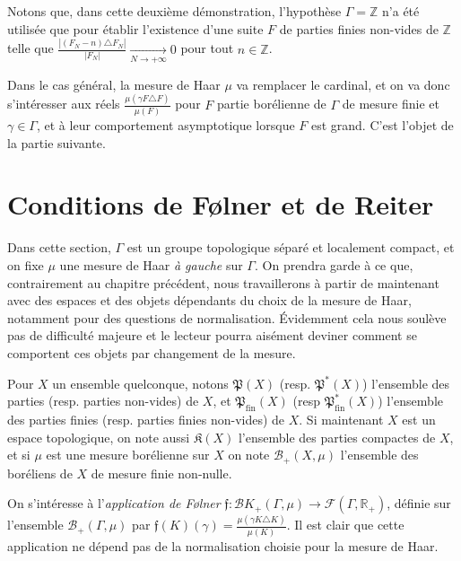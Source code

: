 \documentclass[a4paper,12pt]{article}
\newcommand{\R}{\mathbb{R}}
\newcommand{\Z}{\mathbb{Z}}
\newcommand{\Bor}{\mathcal{B}}
\newcommand{\abs}[1]{\left\vert#1\right\vert}
\newcommand{\card}[1]{\abs{#1}}
\newcommand{\parts}{\mathfrak{P}}
\newcommand{\finparts}{\mathfrak{P}_{\mathrm{fin}}}
\begin{document}
Notons que, dans cette deuxième démonstration, l'hypothèse $\Gamma=\Z$ n'a été utilisée que pour établir l'existence d'une suite $F$ 
de parties finies non-vides de $\Z$
telle que $\frac{\card{(F_N-n)\triangle F_N}}{\card{F_N}} \xrightarrow[N\to+\infty]{} 0$ pour tout $n\in\Z$. 

Dans le cas général, la mesure de Haar $\mu$ va remplacer le cardinal, et on va donc s'intéresser aux réels $\frac{\mu(\gamma F \triangle F)}{\mu(F)}$ 
pour $F$ partie borélienne de $\Gamma$ de mesure finie et $\gamma\in\Gamma$, et à leur comportement asymptotique
lorsque $F$ est grand. C'est l'objet de la partie suivante.

\section{Conditions de F\o{}lner et de Reiter}

Dans cette section, $\Gamma$ est un groupe topologique séparé et localement compact, et on fixe 
$\mu$ une mesure de Haar \emph{à gauche} sur $\Gamma$. On prendra garde à ce que, contrairement au chapitre précédent,
nous travaillerons à partir de maintenant avec des espaces et des objets dépendants du choix de la mesure de Haar,
notamment pour des questions de normalisation. Évidemment cela nous soulève pas de difficulté majeure et 
le lecteur pourra aisément deviner comment se comportent ces objets par changement de la mesure.

Pour $X$ un ensemble quelconque, notons $\parts(X)$ (resp. $\parts^*(X)$) l'ensemble des parties (resp. parties non-vides) de $X$, et $\finparts(X)$ (resp $\finparts^*(X)$) 
l'ensemble des parties finies (resp. parties finies non-vides) de $X$. Si maintenant $X$ est un espace topologique, 
on note aussi $\mathfrak{K}(X)$ l'ensemble des parties compactes de $X$, et si $\mu$ est une mesure borélienne sur 
$X$ on note $\Bor_+(X, \mu)$ l'ensemble des boréliens de $X$ de mesure finie non-nulle. 

On s'intéresse à l'\emph{application de F\o{}lner} $\mathfrak{f} : \Bor{K}_+(\Gamma, \mu) \to \mathcal{F}(\Gamma, \R_+)$, définie sur l'ensemble 
$\Bor_+(\Gamma, \mu)$ par $\mathfrak{f}(K)(\gamma) = \frac{\mu(\gamma K \triangle K)}{\mu(K)}$.
Il est clair que cette application ne dépend pas de la normalisation choisie pour la mesure de Haar.
\end{document}
